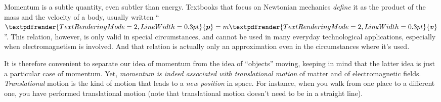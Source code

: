 \documentclass[a4paper,12pt,%
onecolumn,oneside,titlepage,%
british%
]{memoir}
\renewcommand*{\bm}[1]{\textpdfrender{TextRenderingMode=2,LineWidth=0.3pt}{\boldsymbol{#1}}}
\renewcommand*{\|}[1][]{\nonscript\:#1\vert\nonscript\:\mathopen{}}
\begin{document}
Momentum is a subtle quantity, even subtler than energy. Textbooks that focus on Newtonian mechanics \emph{define} it as the product of the mass and the velocity of a body, usually written \enquote{$\bm{p}=m\bm{v}$}. This relation, however, is only valid in special circumstances, and cannot be used in many everyday technological applications, especially when electromagnetism is involved. And that relation is actually only an approximation even in the circumstances where it's used.


It is therefore convenient to separate our idea of momentum from the idea of \enquote{objects} moving, keeping in mind that the latter idea is just a particular case of momentum. Yet, \emph{momentum is indeed associated with translational motion} of matter and of electromagnetic fields. \emph{Translational} motion is the kind of motion that leads to a \emph{new position} in space. For instance, when you walk from one place to a different one, you have performed translational motion (note that translational motion doesn't need to be in a straight line).%
\end{document}
